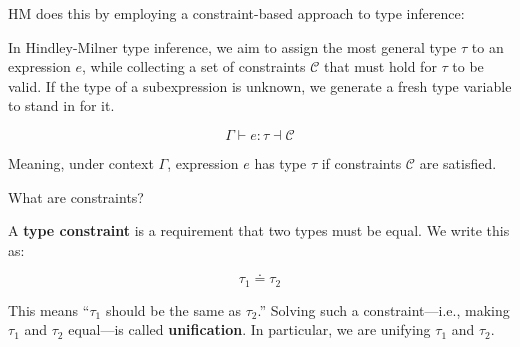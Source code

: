 \noindent
HM does this by employing a constraint-based approach to type inference:
\begin{Def}

    In Hindley-Milner type inference, we aim to assign the most general type $\tau$ to an expression $e$, while collecting a set of constraints $\mathcal{C}$ that must hold for $\tau$ to be valid.
    If the type of a subexpression is unknown, we generate a fresh type variable to stand in for it.
    
    \vspace{-1em}
    \LARGE
    \[
    \Gamma \vdash e : \tau \dashv \mathcal{C}
    \]
    \normalsize
    
    \noindent
    Meaning, under context $\Gamma$, expression $e$ has type $\tau$ if constraints $\mathcal{C}$ are satisfied.
\end{Def}

\newpage 


\noindent
What are constraints?

\begin{Def}

    A \textbf{type constraint} is a requirement that two types must be equal. We write this as:
    
    \vspace{-1.5em}
    \LARGE
    \[
    \tau_1 \doteq \tau_2
    \]
    \normalsize
    
    \noindent
    This means ``$\tau_1$ should be the same as $\tau_2$.''
    Solving such a constraint—i.e., making $\tau_1$ and $\tau_2$ equal—is called \textbf{unification}.
    In particular, we are unifying $\tau_1$ and $\tau_2$.
    \end{Def}
    
\noindent

